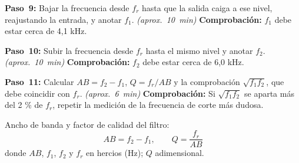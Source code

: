 \documentclass[12pt]{article}
\begin{document}
\begin{pasos}
\par\medskip
  \item \textbf{Paso~9:} Bajar la frecuencia desde $f_r$ hasta que la salida caiga a ese nivel, reajustando la entrada, y anotar $f_1$. \emph{(aprox.~\SI{10}{\minute})} \textbf{Comprobación:} $f_1$ debe estar cerca de 4,1 kHz.
  \item \textbf{Paso~10:} Subir la frecuencia desde $f_r$ hasta el mismo nivel y anotar $f_2$. \emph{(aprox.~\SI{10}{\minute})} \textbf{Comprobación:} $f_2$ debe estar cerca de 6,0 kHz.
  \item \textbf{Paso~11:} Calcular $AB = f_2 - f_1$, $Q = f_r/AB$ y la comprobación $\sqrt{f_1 f_2}$, que debe coincidir con $f_r$. \emph{(aprox.~\SI{6}{\minute})} \textbf{Comprobación:} Si $\sqrt{f_1 f_2}$ se aparta más del 2 \% de $f_r$, repetir la medición de la frecuencia de corte más dudosa.
\par Ancho de banda y factor de calidad del filtro:
\begin{equation}
  AB = f_2 - f_1, \qquad Q = \frac{f_r}{AB}
  \label{eq:paso-11}
\end{equation}
donde $AB$, $f_1$, $f_2$ y $f_r$ en hercios (Hz); $Q$ adimensional.
\end{pasos}
\end{document}
